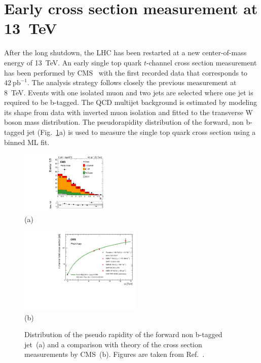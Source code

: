\documentclass{PoS}
\begin{document}
\section{Early cross section measurement at 13~TeV}

After the long shutdown, the LHC has been restarted at a new center-of-mass energy of 13~TeV. An early single top quark $t$-channel cross section measurement has been performed by CMS~\cite{CMS-PAS-TOP-15-004} with the first recorded data that corresponds to $42~\mathrm{pb}^{-1}$.
The analysis strategy follows closely the previous measurement at 8~TeV. Events with one isolated muon and two jets are selected where one jet is required to be b-tagged. The QCD multijet background is estimated by modeling its shape from data with inverted muon isolation and fitted to the transverse W boson mass distribution. The pseudorapidity distribution of the forward, non b-tagged jet (Fig.~\ref{fig:singletop13}a) is used to measure the single top quark cross section using a binned ML fit.
\begin{figure}[htbp]
\begin{center}
\parbox[t]{0.4\textwidth}{\centering\includegraphics[width=0.38\textwidth]{cms_xsec13/mu2j1t.pdf}\\(a)}
\parbox[t]{0.55\textwidth}{\centering\includegraphics[width=0.52\textwidth]{cms_xsec13/xsec.pdf}\\(b)}
\end{center}
\caption{\label{fig:singletop13}Distribution of the pseudo rapidity of the forward non b-tagged jet~(a) and a comparison with theory of the cross section measurements by CMS~(b). Figures are taken from Ref.~\cite{CMS-PAS-TOP-15-004}.}
\end{figure}
\end{document}
